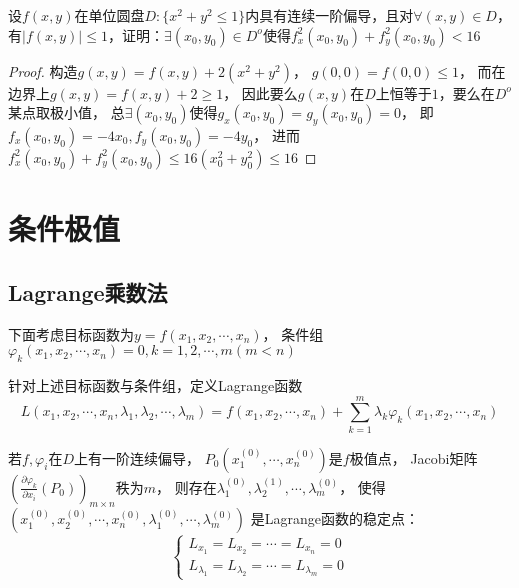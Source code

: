 \begin{exercise}[构造辅助函数]
  设$f(x,y)$在单位圆盘$D: \{x^2 + y^2 \leq 1\}$内具有连续一阶偏导，且对$\forall (x,y) \in D$，
  有$|f(x,y)| \leq 1$，证明：$\exists (x_0,y_0) \in D^o$使得$f_x^2(x_0,y_0) + f_y^2(x_0,y_0) < 16$
\end{exercise}

\begin{proof}
  构造$g(x,y) = f(x,y) + 2(x^2 + y^2)$，
  $g(0,0) = f(0,0) \leq 1$，
  而在边界上$g(x,y) = f(x,y) + 2 \geq 1$，
  因此要么$g(x,y)$在$D$上恒等于$1$，要么在$D^o$某点取极小值，
  总$\exists (x_0,y_0)$使得$g_x(x_0,y_0) = g_y(x_0,y_0) = 0$，
  即$f_x(x_0,y_0) = -4x_0, f_y(x_0,y_0) = -4y_0$，
  进而$f_x^2(x_0,y_0) + f_y^2(x_0,y_0) \leq 16(x_0^2 + y_0^2) \leq 16$
\end{proof}




\section{条件极值}

\subsection{Lagrange乘数法}

下面考虑目标函数为$y = f(x_1,x_2,\cdots,x_n)$，
条件组$\varphi_k(x_1,x_2,\cdots,x_n) = 0, k = 1,2,\cdots,m(m < n)$

\begin{definition}[Lagrange函数]
  针对上述目标函数与条件组，定义Lagrange函数
  \begin{equation*}
    L(x_1,x_2,\cdots,x_n,\lambda_1,\lambda_2,\cdots,\lambda_m) = f(x_1,x_2,\cdots,x_n) + \sum\limits_{k = 1}^m \lambda_k \varphi_k(x_1,x_2,\cdots,x_n)
  \end{equation*}
\end{definition}

\begin{theorem}[Lagrange乘数法]
  若$f,\varphi_i$在$D$上有一阶连续偏导，
  $P_0(x_1^{(0)},\cdots,x_n^{(0)})$是$f$极值点，
  Jacobi矩阵$\left( \frac{\partial \varphi_k}{\partial x_i}(P_0) \right)_{m \times n}$秩为$m$，
  则存在$\lambda_1^{(0)},\lambda_2^{(1)},\cdots,\lambda_m^{(0)}$，
  使得$(x_1^{(0)},x_2^{(0)},\cdots,x_n^{(0)},\lambda_1^{(0)},\cdots,\lambda_m^{(0)})$
  是Lagrange函数的稳定点：
  \begin{equation*}
    \begin{cases}
      L_{x_1} = L_{x_2} = \cdots = L_{x_n} = 0\\
      L_{\lambda_1} = L_{\lambda_2} = \cdots = L_{\lambda_m} = 0
    \end{cases}
  \end{equation*}
\end{theorem}

